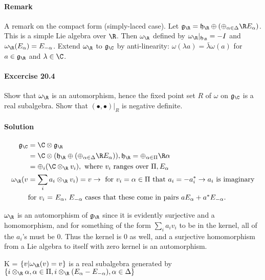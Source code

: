 \documentclass[11pt]{article}
\newcommand{\g}{\ensuremath{\mathfrak{g}}}
\newcommand{\h}{\ensuremath{\mathfrak{h}}}
\begin{document}
\paragraph{Remark}
A remark on the compact form (simply-laced case). Let $\g_{\R} = \h_{\R}
\oplus \left(\oplus_{\alpha \in \Delta} \R E_{\alpha}\right)$. This is a
simple Lie algebra over $\R$. Then $\omega_{\R}$ defined by
$\omega_{\R}\vert_{\h_{\R}} = -I$ and $\omega_{\R}(E_{\alpha})=E_{-\alpha}$.
Extend $\omega_{\R}$ to $\g_{\C}$ by anti-linearity: $\omega(\lambda a)
=\bar{\lambda}\omega(a)$ for $a \in \g_{\R}$ and $\lambda \in \C$.

\paragraph{Excercise 20.4} Show that $\omega_{\R}$ is an automorphism, hence the
fixed point set $R$ of $\omega$ on $\g_{\C}$ is a real subalgebra. Show that
$(\bullet,\bullet)\vert_R$ is negative definite.

\paragraph{Solution}
\begin{align*}
\g_{\C} &= \C \otimes \g_{\R} \\
&= \C \otimes (\h_{\R} \oplus (\oplus_{\alpha \in \Delta} \R E_\alpha)), \h_{\R} = \oplus_{\alpha \in \Pi} \R \alpha \\
&= \oplus_i (\C \otimes_{\R} v_i), \mbox{ where $v_i$ ranges over $\Pi, E_\alpha$} \\
\omega_{\R}(v &= \sum_i a_i \otimes_{\R} v_i) = v \rightarrow \mbox{ for } v_i = \alpha \in \Pi \mbox{ that } a_i = - a_i^* \rightarrow a_i \mbox{ is imaginary} \\
& \mbox{for $v_i$ = $E_\alpha$, $E_{-\alpha}$ cases that these come in pairs $a E_\alpha + a^* E_{-\alpha}$.}
\end{align*}

$\omega_{\R}$ is an automorphism of $\g_{\R}$ since it is evidently surjective and a homomorphism, and for something of the form $\sum_i a_i v_i$ to be in the kernel, all of the $a_i$'s must be 0. Thus the kernel is 0 as well, and a surjective homomorphism from a Lie algebra to itself with zero kernel is an automorphism.

K = $\{ v | \omega_{\R}(v) = v\}$ is a real subalgebra generated by $\{ i \otimes_{\R} \alpha, \alpha \in \Pi, i \otimes_{\R} (E_\alpha - E_{-\alpha}), \alpha \in \Delta\}$
\end{document}
